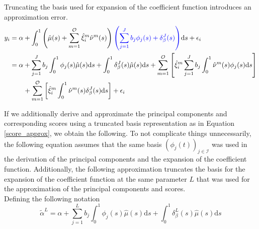 \documentclass[11pt,twoside,a4paper]{article}
\begin{document}
	Truncating the basis used for expansion of the coefficient function introduces an approximation error.
	\begin{equation}\label{fpcr_reg_both_expansions}
		\begin{split}
			y_i &= \alpha + \int_{0}^{1} \left(\hat{\mu}(s) + \sum_{m = 1}^{\mathcal{O}} \hat{\xi}^{m}_i \hat{\nu}^{m}(s)\right) {\color{blue}\left(\sum_{j = 1}^{J} b_j \phi_j(s) + \delta_{\beta}^{J}(s)\right)} \mathrm{d}s + \epsilon_i\\
			&= \alpha + \sum_{j = 1}^{J} b_j \int_{0}^{1} \phi_j(s) \hat{\mu}(s) \mathrm{d}s + \int_{0}^{1} \delta_{\beta}^{J}(s) \hat{\mu}(s) \mathrm{d}s + \sum_{m = 1}^{\mathcal{O}} \left[ \hat{\xi}^m_i \sum_{j = 1}^{J} b_j \int_{0}^{1}\hat{\nu}^m(s) \phi_j(s) \mathrm{d}s \right] \\
			& \quad \quad + \sum_{m = 1}^{\mathcal{O}} \left[ \hat{\xi}^m_i \int_{0}^{1}\hat{\nu}^m(s) \delta_{\beta}^{J}(s) \mathrm{d}s \right] + \epsilon_i
		\end{split}
	\end{equation}

	If we additionally derive and approximate the principal components and corresponding scores using a truncated basis representation as in Equation \ref{score_approx}, we obtain the following. To not complicate things unnecessarily, the following equation assumes that the same basis $\left(\phi_j(t)\right)_{j \in \mathcal{I}}$ was used in the derivation of the principal components and the expansion of the coefficient function. Additionally, the following approximation truncates the basis for the expansion of the coefficient function at the same parameter $L$ that was used for the approximation of the principal components and scores.\\
	Defining the following notation
	\begin{equation}
		\tilde{\alpha}^L = \alpha + \sum_{j = 1}^{L} b_j \int_{0}^{1} \phi_j(s) \hat{\mu}(s) \mathrm{d}s + \int_{0}^{1} \delta_{\beta}^{L}(s) \hat{\mu}(s) \mathrm{d}s
	\end{equation}
	
\end{document}
